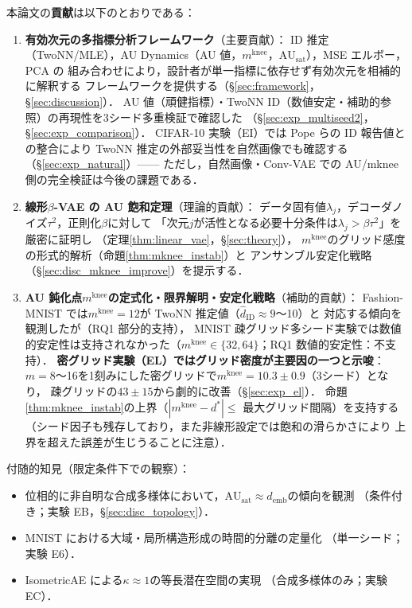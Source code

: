 \documentclass[11pt,a4paper]{jsarticle}
\newcommand{\kap}{\kappa}
\newcommand{\AUsat}{\mathrm{AU}_{\mathrm{sat}}}
\newcommand{\mknee}{m^{\mathrm{knee}}}
\newcommand{\demb}{d_{\mathrm{emb}}}
\begin{document}
本論文の\textbf{貢献}は以下のとおりである：
\begin{enumerate}
  \item \textbf{有効次元の多指標分析フレームワーク}（主要貢献）：
        ID 推定（TwoNN/MLE），AU Dynamics（AU 値，$\mknee$，$\AUsat$），MSE エルボー，PCA の
        組み合わせにより，設計者が単一指標に依存せず有効次元を相補的に解釈する
        フレームワークを提供する（§\ref{sec:framework}，§\ref{sec:discussion}）．
        AU 値（頑健指標）・TwoNN ID（数値安定・補助的参照）の再現性を3シード多重検証で確認した
        （§\ref{sec:exp_multiseed2}，§\ref{sec:exp_comparison}）．
        CIFAR-10 実験（EI）では Pope ら\cite{pope2021intrinsic}の ID 報告値との整合により
        TwoNN 推定の外部妥当性を自然画像でも確認する（§\ref{sec:exp_natural}）——
        ただし，自然画像・Conv-VAE での AU/mknee 側の完全検証は今後の課題である．
  \item \textbf{線形$\beta$-VAE の AU 飽和定理}（理論的貢献）：
        データ固有値$\lambda_j$，デコーダノイズ$\tau^2$，正則化$\beta$に対して
        「次元$j$が活性となる必要十分条件は$\lambda_j > \beta\tau^2$」を厳密に証明し
        （定理\ref{thm:linear_vae}，§\ref{sec:theory}），
        $\mknee$のグリッド感度の形式的解析（命題\ref{thm:mknee_instab}）と
        アンサンブル安定化戦略（§\ref{sec:disc_mknee_improve}）を提示する．
  \item \textbf{AU 鈍化点$\mknee$の定式化・限界解明・安定化戦略}（補助的貢献）：
        Fashion-MNIST では$\mknee = 12$が TwoNN 推定値（$\hat{d}_\mathrm{ID} \approx 9$〜10）と
        対応する傾向を観測したが（RQ1 部分的支持），
        MNIST 疎グリッド多シード実験では数値的安定性は支持されなかった（$\mknee \in \{32,64\}$；RQ1 数値的安定性：不支持）．
        \textbf{密グリッド実験（EL）ではグリッド密度が主要因の一つと示唆}：
        $m=8$〜16を1刻みにした密グリッドで$\mknee = 10.3 \pm 0.9$（3シード）となり，
        疎グリッドの$43 \pm 15$から劇的に改善（§\ref{sec:exp_el}）．
        命題\ref{thm:mknee_instab}の上界（$|\mknee - d^*| \leq$ 最大グリッド間隔）を支持する
        （シード因子も残存しており，また非線形設定では飽和の滑らかさにより
        上界を超えた誤差が生じうることに注意）．
\end{enumerate}

付随的知見（限定条件下での観察）：
\begin{itemize}
  \item 位相的に非自明な合成多様体において，$\AUsat \approx \demb$の傾向を観測
        （条件付き；実験 EB，§\ref{sec:disc_topology}）．
  \item MNIST における大域・局所構造形成の時間的分離の定量化
        （単一シード；実験 E6）．
  \item IsometricAE による$\kap \approx 1$の等長潜在空間の実現
        （合成多様体のみ；実験 EC）．
\end{itemize}
\end{document}
